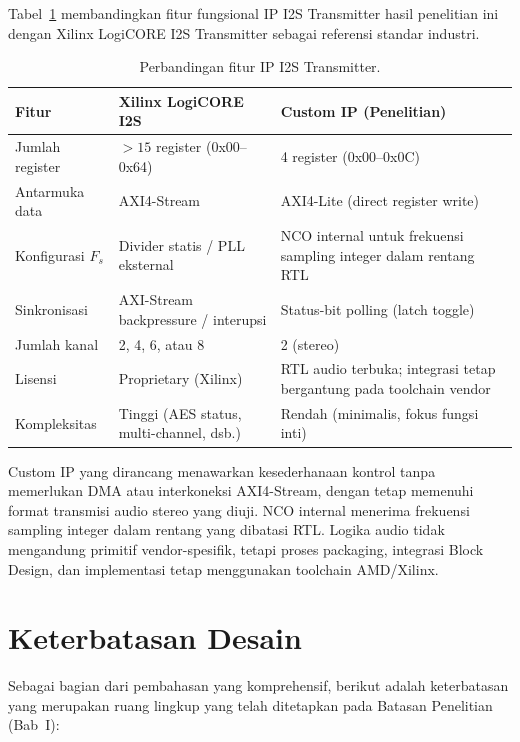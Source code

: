 Tabel~\ref{tab:ch5-comparison-ip} membandingkan fitur fungsional IP I2S Transmitter hasil penelitian ini dengan Xilinx LogiCORE I2S Transmitter \citep{amd_pg308_i2s_logicore} sebagai referensi standar industri.

\begin{table}[htbp]
	\centering
	\caption{Perbandingan fitur IP I2S Transmitter.}
	\label{tab:ch5-comparison-ip}
	\begin{tabular}{|l|p{5cm}|p{5cm}|}
		\hline
		\textbf{Fitur} & \textbf{Xilinx LogiCORE I2S} & \textbf{Custom IP (Penelitian)} \\
		\hline
		Jumlah register     & $>15$ register (0x00--0x64)
		& 4 register (0x00--0x0C) \\
		Antarmuka data      & AXI4-Stream
		& AXI4-Lite (direct register write) \\
		Konfigurasi $F_s$   & Divider statis / PLL eksternal
		& NCO internal untuk frekuensi sampling integer dalam rentang RTL \\
		Sinkronisasi        & AXI-Stream backpressure / interupsi
		& Status-bit polling (latch toggle) \\
		Jumlah kanal        & 2, 4, 6, atau 8
		& 2 (stereo) \\
		Lisensi             & Proprietary (Xilinx)
		& RTL audio terbuka; integrasi tetap bergantung pada toolchain vendor \\
		Kompleksitas        & Tinggi (AES status, multi-channel, dsb.)
		& Rendah (minimalis, fokus fungsi inti) \\
		\hline
	\end{tabular}
\end{table}

Custom IP yang dirancang menawarkan kesederhanaan kontrol tanpa memerlukan DMA atau interkoneksi AXI4-Stream, dengan tetap memenuhi format transmisi audio stereo yang diuji. NCO internal menerima frekuensi sampling integer dalam rentang yang dibatasi RTL. Logika audio tidak mengandung primitif vendor-spesifik, tetapi proses packaging, integrasi Block Design, dan implementasi tetap menggunakan toolchain AMD/Xilinx.

\section{Keterbatasan Desain}

Sebagai bagian dari pembahasan yang komprehensif, berikut adalah keterbatasan yang merupakan ruang lingkup yang telah ditetapkan pada Batasan Penelitian (Bab~I):

